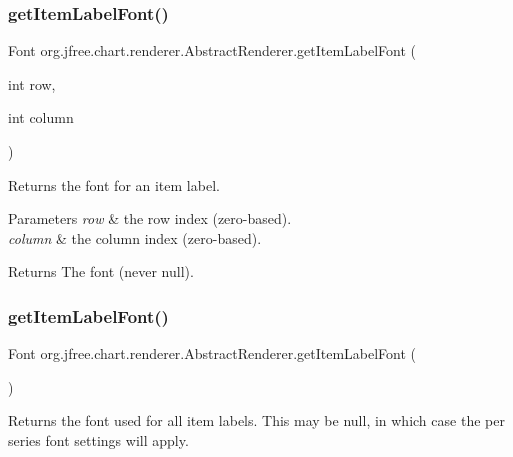 \subsubsection{\texorpdfstring{get\+Item\+Label\+Font()}{getItemLabelFont()}\hspace{0.1cm}{\footnotesize\ttfamily [1/2]}}
{\footnotesize\ttfamily Font org.\+jfree.\+chart.\+renderer.\+Abstract\+Renderer.\+get\+Item\+Label\+Font (\begin{DoxyParamCaption}\item[{int}]{row,  }\item[{int}]{column }\end{DoxyParamCaption})}

Returns the font for an item label.


\begin{DoxyParams}{Parameters}
{\em row} & the row index (zero-\/based). \\
\hline
{\em column} & the column index (zero-\/based).\\
\hline
\end{DoxyParams}
\begin{DoxyReturn}{Returns}
The font (never {\ttfamily null}). 
\end{DoxyReturn}
\mbox{\label{classorg_1_1jfree_1_1chart_1_1renderer_1_1_abstract_renderer_a41446f3d3514335858bfb60e72b53e26}} 
\subsubsection{\texorpdfstring{get\+Item\+Label\+Font()}{getItemLabelFont()}\hspace{0.1cm}{\footnotesize\ttfamily [2/2]}}
{\footnotesize\ttfamily Font org.\+jfree.\+chart.\+renderer.\+Abstract\+Renderer.\+get\+Item\+Label\+Font (\begin{DoxyParamCaption}{ }\end{DoxyParamCaption})}

Returns the font used for all item labels. This may be {\ttfamily null}, in which case the per series font settings will apply.

